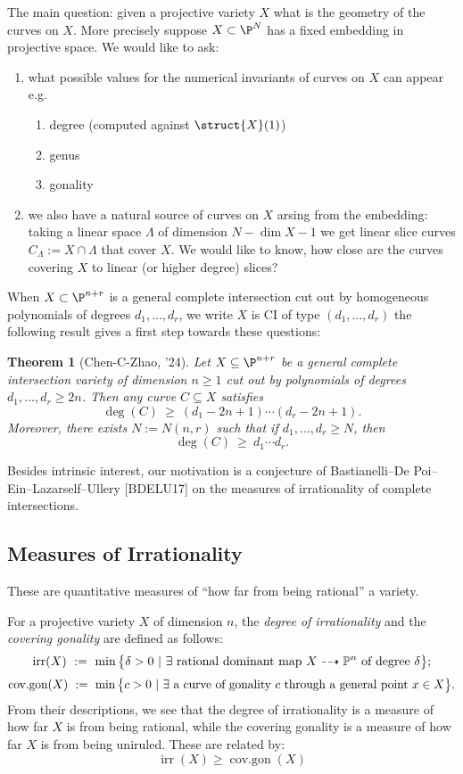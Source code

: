 \documentclass[12pt]{article}
\theoremstyle{plain}
\newtheorem{Lthm}{Theorem}
\DeclareMathOperator{\irr}{irr}
\DeclareMathOperator{\cov}{cov.gon}
\newcommand{\mb}[1]{\mathbb{#1}}
\DeclareMathOperator{\cg}{cov.gon}
\begin{document}
The main question: given a projective variety $X$ what is the geometry of the curves on $X$. More precisely suppose $X \subset \P^N$ has a fixed embedding in projective space. We would like to ask:
\begin{enumerate}
\item what possible values for the numerical invariants of curves on $X$ can appear e.g.
\begin{enumerate}
\item degree (computed against $\struct{X}(1)$)
\item genus 
\item gonality
\end{enumerate}
\item we also have a natural source of curves on $X$ arsing from the embedding: taking a linear space $\Lambda$ of dimension $N - \dim{X}-1$ we get linear slice curves $C_\Lambda := X \cap \Lambda$ that cover $X$. We would like to know, how close are the curves covering $X$ to linear (or higher degree) slices? 
\end{enumerate}
When $X \subset \P^{n+r}$ is a general complete intersection cut out by homogeneous polynomials of degrees $d_1, \dots, d_r$, we write $X$ is CI of type $(d_1, \dots, d_r)$ the following result gives a first step towards these questions:

\begin{Lthm}[Chen-C-Zhao, '24]
Let $X \subseteq \P^{n+r}$ be a general complete intersection variety of dimension $n \geq 1$ cut out by polynomials of degrees $d_{1}, \ldots, d_{r} \geq 2n$. Then any curve $C \subseteq X$ satisfies
\[ \deg(C)\ \ge\ (d_1 - 2n + 1) \cdots (d_r - 2n + 1) .\]
Moreover, there exists $N := N(n,r)$ such that if $d_1, \dots, d_r \ge N$, then
\[ \deg(C)\ \ge\ d_1 \cdots d_r. \]
\end{Lthm}

{\color{red} Besides intrinsic interest, our motivation is a conjecture of Bastianelli--De Poi--Ein--Lazarself--Ullery [BDELU17] on the measures of irrationality of complete intersections.}

\subsection{Measures of Irrationality}

{\color{red} These are quantitative measures of ``how far from being rational'' a variety. }

For a projective variety $X$ of dimension $n$, the \emph{degree of irrationality} and the \emph{covering gonality} are defined as follows:
\[ \irr(X)\ :=\ \min\big\{\delta>0\ |\ \exists\textup{ rational dominant map } X\dashrightarrow \mb{P}^n\textup{ of degree }\delta\big\}; \]
\[ \cov(X)\ :=\ \min\big\{c>0\ |\ \exists\textup{ a curve of gonality } c \textup{ through a general point } x\in X\big\}.\]
{\color{red} From their descriptions, we see that the degree of irrationality is a measure of how far $X$ is from being rational, while the covering gonality is a measure of how far $X$ is from being uniruled.} These are related by: 
\[ \irr(X) \geq \cg(X) \]
\end{document}

